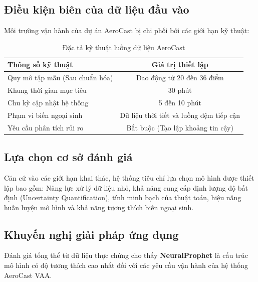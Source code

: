 \documentclass[12pt,a4paper]{article}
\begin{document}
\subsection{Điều kiện biên của dữ liệu đầu vào}

Môi trường vận hành của dự án AeroCast bị chi phối bởi các giới hạn kỹ thuật:

\begin{table}[htbp]
\centering
\caption{Đặc tả kỹ thuật luồng dữ liệu AeroCast}
\label{tab:aero_characteristics}
\begin{tabular}{|l|c|}
\hline
\textbf{Thông số kỹ thuật} & \textbf{Giá trị thiết lập} \\
\hline
Quy mô tập mẫu (Sau chuẩn hóa) & Dao động từ 20 đến 36 điểm \\
Khung thời gian mục tiêu & 30 phút \\
Chu kỳ cập nhật hệ thống & 5 đến 10 phút \\
Phạm vi biến ngoại sinh & Dữ liệu thời tiết và luồng đệm tiếp cận \\
Yêu cầu phân tích rủi ro & Bắt buộc (Tạo lập khoảng tin cậy) \\
\hline
\end{tabular}
\end{table}

\subsection{Lựa chọn cơ sở đánh giá}

Căn cứ vào các giới hạn khai thác, hệ thống tiêu chí lựa chọn mô hình được thiết lập bao gồm: Năng lực xử lý dữ liệu nhỏ, khả năng cung cấp định lượng độ bất định (Uncertainty Quantification), tính minh bạch của thuật toán, hiệu năng huấn luyện mô hình và khả năng tương thích biến ngoại sinh.

\subsection{Khuyến nghị giải pháp ứng dụng}

Đánh giá tổng thể từ dữ liệu thực chứng cho thấy \textbf{NeuralProphet} là cấu trúc mô hình có độ tương thích cao nhất đối với các yêu cầu vận hành của hệ thống AeroCast VAA. 
\end{document}
